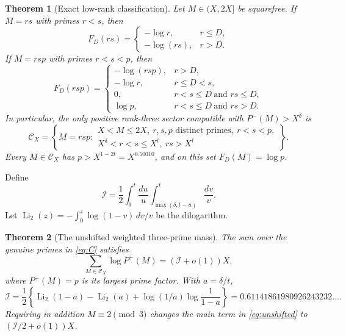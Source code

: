 \documentclass[11pt]{article}
\newtheorem{theorem}{Theorem}[section]
\newcommand{\cset}{\mathcal C}
\newcommand{\phimin}{P^-}
\begin{document}
\begin{theorem}[Exact low-rank classification]\label{th:classification}
Let $M\in(X,2X]$ be squarefree.  If $M=rs$ with primes $r<s$, then
\begin{equation}\label{eq:rank2}
 F_D(rs)=\begin{cases}-\log r,&r\le D,\\
                         -\log(rs),&r>D.
          \end{cases}
\end{equation}
If $M=rsp$ with primes $r<s<p$, then
\begin{equation}\label{eq:rank3}
 F_D(rsp)=\begin{cases}
  -\log(rsp),&r>D,\\
  -\log r,&r\le D<s,\\
  0,&r<s\le D\ \text{and }rs\le D,\\
  \log p,&r<s\le D\ \text{and }rs>D.
 \end{cases}
\end{equation}
In particular, the only positive rank-three sector compatible with
$\phimin(M)>X^\delta$ is
\begin{equation}\label{eq:C}
 \cset_X=\left\{M=rsp:\begin{array}{l}
 X<M\le2X,\ r,s,p\text{ distinct primes},\ r<s<p,\\
 X^\delta<r<s\le X^t,\ rs>X^t
 \end{array}\right\}.
\end{equation}
Every $M\in\cset_X$ has $p>X^{1-2t}=X^{0.50010}$, and on this set
$F_D(M)=\log p$.
\end{theorem}

Define
\begin{equation}\label{eq:I}
 \mathcal I=\frac12\int_\delta^t\frac{du}{u}
              \int_{\max(\delta,t-u)}^t\frac{dv}{v}.
\end{equation}
Let $\operatorname{Li}_2(z)=-\int_0^z\log(1-v)\,dv/v$ be the dilogarithm.

\begin{theorem}[The unshifted weighted three-prime mass]\label{th:unshifted}
The sum over the \emph{genuine} primes in \eqref{eq:C} satisfies
\begin{equation}\label{eq:unshifted}
 \sum_{M\in\cset_X}\log P^+(M)=(\mathcal I+o(1))X,
\end{equation}
where $P^+(M)=p$ is its largest prime factor.  With $a=\delta/t$,
\begin{equation}\label{eq:dilog}
 \mathcal I=\frac12\left\{
 \operatorname{Li}_2(1-a)-\operatorname{Li}_2(a)
 +\log(1/a)\log\frac1{1-a}\right\}
 =0.61141861980926243232\ldots .
\end{equation}
Requiring in addition $M\equiv2\pmod3$ changes the main term in
\eqref{eq:unshifted} to $(\mathcal I/2+o(1))X$.
\end{theorem}
\end{document}
